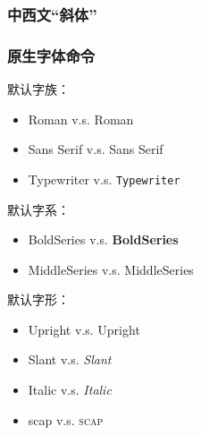 \documentclass{ctexart}
\begin{document}
        \subsubsection{中西文“斜体”}
        \subsubsection{原生字体命令}
        
            默认字族：\familydefault %
            \begin{itemize}
                \item Roman v.s. \textrm{Roman} %
                \item Sans Serif v.s. \textsf{Sans Serif} %
                \item Typewriter v.s. \texttt{Typewriter} %
            \end{itemize}
        
            默认字系：\seriesdefault %
            \begin{itemize}
                \item BoldSeries v.s. \textbf{BoldSeries} %
                \item MiddleSeries v.s. \textmd{MiddleSeries} %
            \end{itemize}

            默认字形：\shapedefault %
            \begin{itemize}
                \item Upright v.s. \textup{Upright} %
                \item Slant v.s. \textsl{Slant} %
                \item Italic v.s. \textit{Italic} %
                \item scap v.s. \textsc{scap} %
            \end{itemize}
\end{document}
